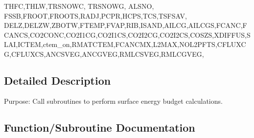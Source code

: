\begin{DoxyCompactItemize}
T\+H\+F\+C,T\+H\+L\+W,T\+R\+S\+N\+O\+W\+C, T\+R\+S\+N\+O\+W\+G, A\+L\+S\+N\+O, F\+S\+S\+B,F\+R\+O\+O\+T,F\+R\+O\+O\+T\+S,R\+A\+D\+J,P\+C\+P\+R,H\+C\+P\+S,T\+C\+S,T\+S\+F\+S\+A\+V, D\+E\+L\+Z,D\+E\+L\+Z\+W,Z\+B\+O\+T\+W,F\+T\+E\+M\+P,F\+V\+A\+P,R\+I\+B,I\+S\+A\+N\+D,A\+I\+L\+C\+G,A\+I\+L\+C\+G\+S,F\+C\+A\+N\+C,F\+C\+A\+N\+C\+S,C\+O2\+C\+O\+N\+C,C\+O2\+I1\+C\+G,C\+O2\+I1\+C\+S,C\+O2\+I2\+C\+G,C\+O2\+I2\+C\+S,C\+O\+S\+Z\+S,X\+D\+I\+F\+F\+U\+S,S\+L\+A\+I,I\+C\+T\+E\+M,ctem\+\_\+on,R\+M\+A\+T\+C\+T\+E\+M,F\+C\+A\+N\+C\+M\+X,L2\+M\+A\+X,N\+O\+L2\+P\+F\+T\+S,C\+F\+L\+U\+X\+C\+G,C\+F\+L\+U\+X\+C\+S,A\+N\+C\+S\+V\+E\+G,A\+N\+C\+G\+V\+E\+G,R\+M\+L\+C\+S\+V\+E\+G,R\+M\+L\+C\+G\+V\+E\+G,
\end{DoxyCompactItemize}


\subsection{Detailed Description}
Purpose\+: Call subroutines to perform surface energy budget calculations. 



\subsection{Function/\+Subroutine Documentation}
\hypertarget{CLASST_8f_aae7caf500dbc44213c77f3ff2846253f}{}
